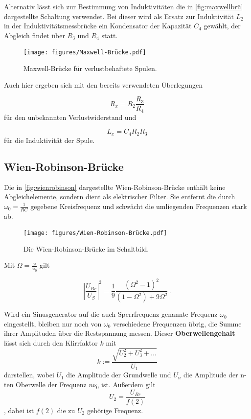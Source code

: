 Alternativ lässt sich zur Bestimmung von Induktivitäten die in \autoref{fig:maxwellbrü} dargestellte
Schaltung verwendet.
Bei dieser wird als Ersatz zur Induktivität $L_2$ in der Induktivitätsmessbrücke ein Kondensator
der Kapazität $C_4$ gewählt, der Abgleich findet über $R_3$ und $R_4$ statt.

\begin{figure}[H]
    \centering
    \texttt{[image: figures/Maxwell-Brücke.pdf]}
    \caption{Maxwell-Brücke für verlustbehaftete Spulen\cite{ap07}.}
    \label{fig:maxwellbrü}
\end{figure}

Auch hier ergeben sich mit den bereits verwendeten Überlegungen

\begin{equation}
    R_x = R_2 \frac{R_3}{R_4}
    \label{eq:resxmaxwell}
\end{equation} für den unbekannten Verlustwiderstand und

\begin{equation}
    L_x = C_4 R_2 R_3
    \label{eq:induxmaxwell}
\end{equation} für die Induktivität der Spule.


\subsection{Wien-Robinson-Brücke}
\label{subsec:wienrobinson}

Die in \autoref{fig:wienrobinson} dargestellte Wien-Robinson-Brücke enthält keine Abgleichelemente, 
sondern dient als elektrischer Filter.
Sie entfernt die durch $ω_0 = \frac{1}{R C}$ gegebene Kreisfrequenz und schwächt die umliegenden 
Frequenzen stark ab. 

\begin{figure}[H]
    \centering
    \texttt{[image: figures/Wien-Robinson-Brücke.pdf]}
    \caption{Die Wien-Robinson-Brücke im Schaltbild\cite{ap07}.}
    \label{fig:wienrobinson}
\end{figure}

Mit $Ω = \frac{ω}{ω_0}$ gilt

\begin{equation}
    \left|\frac{U_{Br}}{U_S}\right|^2 = \frac{1}{9} \frac{(Ω^2 - 1)^2}{(1 - Ω^2) +9Ω^2} \,.
\end{equation}

Wird ein Sinusgenerator auf die auch Sperrfrequenz genannte Frequenz $ω_0$ eingestellt, bleiben nur
noch von $ω_0$ verschiedene Frequenzen übrig, die Summe ihrer Amplituden über die Restspannung messen.
Dieser \textbf{Oberwellengehalt} lässt sich durch den Klirrfaktor $k$ mit 
\begin{equation}
    k := \frac{\sqrt{U_2^2 + U_3^2 + ...}}{U_1}
    \label{eq:klirrfaktor}
\end{equation} darstellen, wobei $U_1$ die Amplitude der Grundwelle und $U_n$ die Amplitude der n-ten
Oberwelle der Frequenz $n ν_0$ ist.
Außerdem gilt
\begin{equation}
    U_2 = \frac{U_{Br}}{f(2)}
    \label{eq:U2klirr}
\end{equation}, dabei ist $f(2)$ die zu $U_2$ gehörige Frequenz.


